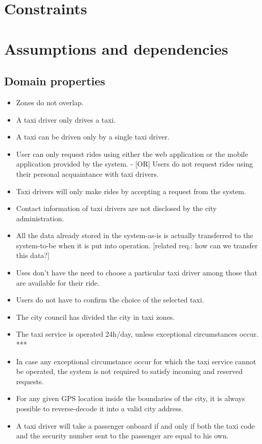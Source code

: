 \section{Constraints}

\section{Assumptions and dependencies}
\subsection{Domain properties}
\begin{itemize}
\item Zones do not overlap.
\item A taxi driver only drives a taxi.
\item A taxi can be driven only by a single taxi driver.
\item User can only request rides using either the web application or the mobile application provided by the system.
- [OR] Users do not request rides using their personal acquaintance with taxi drivers.
\item Taxi drivers will only make rides by accepting a request from the system.
\item Contact information of taxi drivers are not disclosed by the city administration.
\item All the data already stored in the system-as-is is actually transferred to the system-to-be when it is put into operation. [related req.: how can we transfer this data?]
\item Uses don't have the need to choose a particular taxi driver among those that are available for their ride.
\item Users do not have to confirm the choice of the selected taxi.
\item The city council has divided the city in taxi zones.
\item The taxi service is operated 24h/day, unless exceptional circumstances occur. ***
\item In case any exceptional circumstance occur for which the taxi service cannot be operated, the system is not required to satisfy incoming and reserved requests. 
\item For any given GPS location inside the boundaries of the city, it is always possible to reverse-decode it into a valid city address. 
\item A taxi driver will take a passenger onboard if and only if both the taxi code and the security number sent to the passenger are equal to his own. 


\end{itemize}
